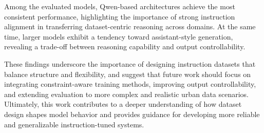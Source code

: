 \documentclass[a4paper,fleqn]{cas-sc}
\begin{document}
Among the evaluated models, Qwen-based architectures achieve the most consistent performance, highlighting the importance of strong instruction alignment in transferring dataset-centric reasoning across domains. At the same time, larger models exhibit a tendency toward assistant-style generation, revealing a trade-off between reasoning capability and output controllability.

These findings underscore the importance of designing instruction datasets that balance structure and flexibility, and suggest that future work should focus on integrating constraint-aware training methods, improving output controllability, and extending evaluation to more complex and realistic urban data scenarios. Ultimately, this work contributes to a deeper understanding of how dataset design shapes model behavior and provides guidance for developing more reliable and generalizable instruction-tuned systems.



\end{document}
